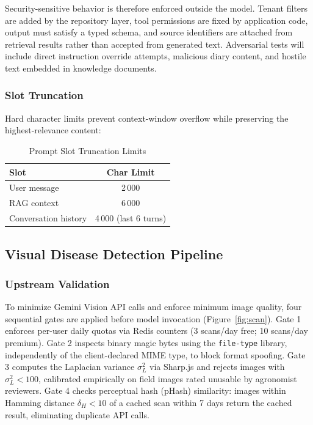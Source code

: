 \documentclass[conference]{IEEEtran}
\begin{document}
Security-sensitive behavior is therefore enforced outside the model. Tenant filters are added by the repository layer, tool permissions are fixed by application code, output must satisfy a typed schema, and source identifiers are attached from retrieval results rather than accepted from generated text. Adversarial tests will include direct instruction override attempts, malicious diary content, and hostile text embedded in knowledge documents.

\subsubsection{Slot Truncation}

Hard character limits prevent context-window overflow while
preserving the highest-relevance content:

\begin{table}[htbp]
\caption{Prompt Slot Truncation Limits}
\label{tab:trunc}
\centering
\begin{tabular}{lc}
\toprule
\textbf{Slot} & \textbf{Char Limit} \\
\midrule
User message      & 2\,000 \\
RAG context       & 6\,000 \\
Conversation history & 4\,000 (last 6 turns) \\
\bottomrule
\end{tabular}
\end{table}

\subsection{Visual Disease Detection Pipeline}
\label{sec:vision}

\subsubsection{Upstream Validation}

To minimize Gemini Vision API calls and enforce minimum image quality,
four sequential gates are applied before model invocation
(Figure~\ref{fig:scan}). Gate 1 enforces per-user daily quotas via
Redis counters (3 scans/day free; 10 scans/day premium). Gate 2
inspects binary magic bytes using the \texttt{file-type} library,
independently of the client-declared MIME type, to block format
spoofing. Gate 3 computes the Laplacian variance $\sigma^2_L$ via
Sharp.js and rejects images with $\sigma^2_L < 100$, calibrated
empirically on field images rated unusable by agronomist reviewers.
Gate 4 checks perceptual hash (pHash) similarity: images within
Hamming distance $\delta_H < 10$ of a cached scan within 7 days
return the cached result, eliminating duplicate API calls.
\end{document}
